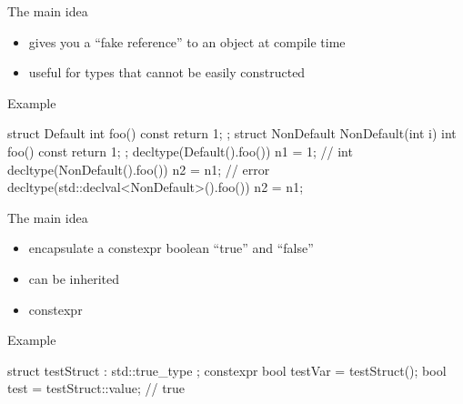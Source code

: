 \begin{frame}[fragile]
  \begin{block}{The main idea}
    \begin{itemize}
    \item gives you a ``fake reference'' to an object at compile time
    \item useful for types that cannot be easily constructed
    \end{itemize}
  \end{block}
  \begin{exampleblock}{Example}
    \begin{cppcode*}{}
      struct Default {
        int foo() const { return 1; }
      };
      struct NonDefault {
        NonDefault(int i) { }
        int foo() const { return 1; }
      }; 
      decltype(Default().foo()) n1 = 1;     // int
      decltype(NonDefault().foo()) n2 = n1; // error
      decltype(std::declval<NonDefault>().foo()) n2 = n1;
    \end{cppcode*}
  \end{exampleblock}  
\end{frame}

\begin{frame}[fragile]
  \begin{block}{The main idea}
    \begin{itemize}
    \item encapsulate a constexpr boolean ``true'' and ``false''
    \item can be inherited
    \item constexpr
    \end{itemize}
  \end{block}
  \begin{exampleblock}{Example}
    \begin{cppcode*}{}
      struct testStruct : std::true_type { };
      constexpr bool testVar = testStruct();
      bool test = testStruct::value; // true
    \end{cppcode*}
  \end{exampleblock}  
\end{frame}

